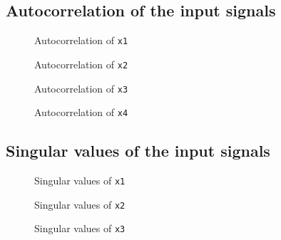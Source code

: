\documentclass[final]{scrreprt} %
\begin{document}
\subsection{Autocorrelation of the input signals}

\begin{figure}[H]
	\centering
    	\setlength\figureheight{6cm}
    	\setlength\figurewidth{10cm}
    	    	
    	\caption{Autocorrelation of \texttt{x1}}
    	\label{fig:auto1}
\end{figure}
\begin{figure}[H]
	\centering
    	\setlength\figureheight{6cm}
    	\setlength\figurewidth{10cm}
    	    	
    	\caption{Autocorrelation of \texttt{x2}}
    	\label{fig:auto2}
\end{figure}
\begin{figure}[H]
	\centering
    	\setlength\figureheight{6cm}
    	\setlength\figurewidth{10cm}
    	    	
    	\caption{Autocorrelation of \texttt{x3}}
    	\label{fig:auto3}
\end{figure}
\begin{figure}[H]
	\centering
    	\setlength\figureheight{6cm}
    	\setlength\figurewidth{10cm}
    	    	
    	\caption{Autocorrelation of \texttt{x4}}
    	\label{fig:auto4}
\end{figure}

\subsection{Singular values of the input signals}

\begin{figure}[H]
	\centering
    	\setlength\figureheight{6cm}
    	\setlength\figurewidth{10cm}
    	    	
    	\caption{Singular values of \texttt{x1}}
    	\label{fig:auto1}
\end{figure}

\begin{figure}[H]
	\centering
    	\setlength\figureheight{6cm}
    	\setlength\figurewidth{10cm}
    	    	
    	\caption{Singular values of \texttt{x2}}
    	\label{fig:auto1}
\end{figure}

\begin{figure}[H]
	\centering
    	\setlength\figureheight{6cm}
    	\setlength\figurewidth{10cm}
    	    	
    	\caption{Singular values of \texttt{x3}}
    	\label{fig:auto1}
\end{figure}
\end{document}
